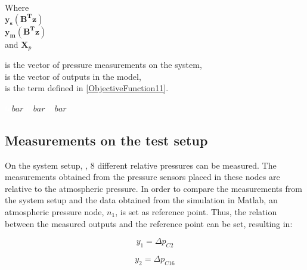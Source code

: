\begin{minipage}[t]{0.20\textwidth}
Where\\
\hspace*{8mm} $\bm{y_{s}(B^T z)}$ \\
\hspace*{8mm} $\bm{y_{m}(B^T z)}$ \\
and \hspace*{0.7mm} $\mathcal{\bm{X}}_p$ 
\end{minipage}
\begin{minipage}[t]{0.68\textwidth}
\vspace*{2mm}
is the vector of pressure measurements on the system,\\
is the vector of outputs in the model, \\
is the term defined in \eqref{ObjectiveFunction11}.
\end{minipage}
\begin{minipage}[t]{0.10\textwidth}
\vspace*{2mm}
\textcolor{White}{te}$\unit{bar}$
\textcolor{White}{te}$\unit{bar}$
\textcolor{White}{te}$\unit{bar}$
\end{minipage}
\subsection{Measurements on the test setup}

On the system setup, , $8$ different relative pressures can be measured. The measurements obtained from the pressure sensors 
placed in these nodes are relative to the atmospheric pressure. In order to compare the measurements from the system setup and the data 
obtained from the simulation in Matlab, an atmospheric pressure node, $n_1$, is set as reference point. Thus, the relation between the measured 
outputs and the reference point can be set, resulting in:

\vspace{4mm}
\begin{equation}
    y_1 = \Delta p_{C2} 
\end{equation}

\vspace{4mm}
\begin{equation}
   y_2 = \Delta p_{C16} 
 \end{equation}

